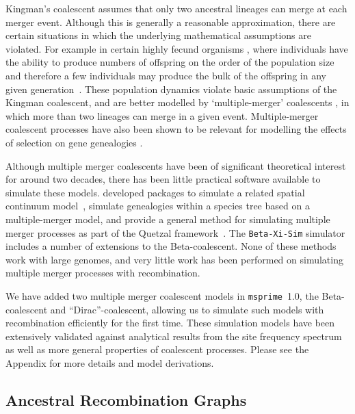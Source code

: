 \documentclass{article}
\newcommand{\msprime}[0]{\texttt{msprime}}
\begin{document}
Kingman's coalescent assumes that only two ancestral lineages can merge at
each merger event. Although this is generally a reasonable approximation, there
are certain situations in which the underlying mathematical assumptions are
violated. For example in certain highly fecund organisms
\citep{hedgecock_94,B94,HP11,A04,irwin16}, where individuals have the ability
to produce numbers of offspring on the order of the population size and
therefore a few individuals may produce the bulk of the offspring in any given
generation~\citep{hedgecock_94}. These population dynamics violate basic
assumptions of the Kingman coalescent, and are better modelled by
`multiple-merger' coalescents \citep{DK99,P99,S99,S00,MS01}, in which more than
two lineages can merge in a given event. Multiple-merger coalescent processes
have also been shown to be relevant for modelling the effects of selection on
gene genealogies \citep{Gillespie909,DS04}.

Although multiple merger coalescents have been of significant theoretical
interest for around two decades, there has been little practical software
available to simulate these models.
\cite{kelleher2013coalescent,kelleher2014coalescent} developed packages to
simulate a related spatial continuum model~\citep{barton2010new},
\cite{zhu2015hybrid} simulate genealogies within a species tree
based on a multiple-merger model, and
\cite{becheler2020occupancy} provide a general method for simulating
multiple merger processes
as part of the Quetzal framework~\citep{becheler2019quetzal}.
The \texttt{Beta-Xi-Sim} simulator~\citep{koskela2018multi,koskela2019robust}
includes a number of extensions to the Beta-coalescent.
None of these methods work with large genomes, and very little work
has been performed on simulating multiple merger processes with recombination.

We have added two multiple merger coalescent models in \msprime\ 1.0, the
Beta-coalescent and ``Dirac''-coalescent, allowing us to simulate
such models with recombination efficiently for the first time.
These simulation models have been extensively validated against
analytical results from the site frequency
spectrum~\citep{birkner2013statistical,blath2016site,hobolth2019phase}
 as well as more general properties of coalescent processes.
Please see the Appendix for more details and model derivations.

\subsection*{Ancestral Recombination Graphs}
\label{sec-arg}
\end{document}
